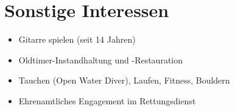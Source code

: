 

\section*{Sonstige Interessen}

\begin{itemize}
	\setlength{\itemsep}{0pt}
	\item Gitarre spielen (seit 14 Jahren)
	\item Oldtimer-Instandhaltung und -Restauration
	\item Tauchen (Open Water Diver), Laufen, Fitness, Bouldern
	\item Ehrenamtliches Engagement im Rettungsdienst
\end{itemize}

